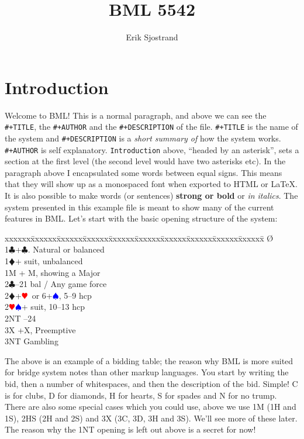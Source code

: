 \documentclass[a4paper]{article}
\title{BML 5542}
\author{Erik Sjostrand}
\newcommand{\BC}{\textcolor{OliveGreen}{$\clubsuit$}}
\newcommand{\BD}{\textcolor{RedOrange}{$\vardiamondsuit$}}
\newcommand{\BH}{\textcolor{Red}{$\varheartsuit${}}}
\newcommand{\BS}{\textcolor{Blue}{$\spadesuit${}}}
\newenvironment{bidtable}
{\begin{tabbing}

xxxxxx\=xxxxxx\=xxxxxx\=xxxxxx\=xxxxxx\=xxxxxx\=xxxxxx\=xxxxxx\=xxxxxx\=xxxxxx\=\kill}
{\end{tabbing} }%
\begin{document}
\maketitle
\tableofcontents

\section{Introduction}

Welcome to BML! This is a normal paragraph, and above we can see
the \texttt{\#+TITLE}, the \texttt{\#+AUTHOR} and the \texttt{\#+DESCRIPTION} of the file. \texttt{\#+TITLE} is
the name of the system and \texttt{\#+DESCRIPTION} is a \emph{short summary of} how
the system works. \texttt{\#+AUTHOR} is self explanatory. \texttt{Introduction} above,
``headed by an asterisk'', sets a section at the first level (the second
level would have two asterisks etc).
\bigbreak
In the paragraph above I encapsulated some words between equal
signs. This means that they will show up as a monospaced font when
exported to HTML or LaTeX. It is also possible to make words (or
sentences) \textbf{strong or bold} or \emph{in italics}.
\bigbreak
The system presented in this example file is meant to show many
of the current features in BML. Let's start with the basic opening
structure of the system:
\bigbreak
\begin{bidtable}
\O\+\\
1\BC {}+\BC . Natural or balanced\\
1\BD {}+ suit, unbalanced\\
1M + M, showing a Major\\
2\BC {}--21 bal / Any game force\\
2\BD {}+\BH\ or 6+\BS , 5--9 hcp\\
2\BH\BS {}+ suit, 10--13 hcp\\
2NT --24\\
3X +X, Preemptive\\
3NT \> Gambling\-
\end{bidtable}
\bigbreak
The above is an example of a bidding table; the reason why BML is
more suited for bridge system notes than other markup languages. You
start by writing the bid, then a number of whitespaces, and then the
description of the bid. Simple! C is for clubs, D for diamonds, H
for hearts, S for spades and N for no trump. There are also some
special cases which you could use, above we use 1M (1H and 1S), 2HS
(2H and 2S) and 3X (3C, 3D, 3H and 3S). We'll see more of these
later.
\bigbreak
The reason why the 1NT opening is left out above is a secret for
now!
\bigbreak
\end{document}
